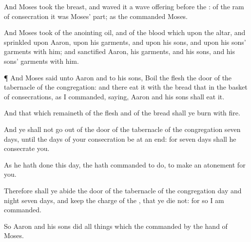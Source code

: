 {And
Moses
took the
breast, and
waved it
{} a wave
offering
before the
{}:
{} of the
ram of
consecration it was
Moses’
part; as the
{}
commanded
Moses.

And
Moses
took of the
anointing
oil, and of the
blood which
{} upon the
altar, and
sprinkled
{} upon
Aaron,
{} upon his
garments, and upon his
sons, and upon his
sons’
garments with him; and
sanctified
Aaron,
{} his
garments, and his
sons, and his
sons’
garments with him.


\par }{\PP {}¶ And
Moses
said unto
Aaron and to his
sons,
Boil the
flesh
{} the
door of the
tabernacle of the
congregation: and there
eat it with the
bread that
{} in the
basket of
consecrations, as I
commanded,
saying,
Aaron and his
sons shall
eat it.

And that which
remaineth of the
flesh and of the
bread shall ye
burn with
fire.

And ye shall not go
out of the
door of the
tabernacle of the
congregation
{}
seven
days, until the
days of your
consecration be at an
end: for
seven
days shall he
consecrate you.

As he hath
done this
day,
{} the
{} hath
commanded to
do, to make an
atonement for you.

Therefore shall ye
abide
{} the
door of the
tabernacle of the
congregation
day and
night
seven
days, and
keep the
charge of the
{}, that ye
die not: for so I am
commanded.

So
Aaron and his
sons
did all
things which the
{}
commanded by the
hand of
Moses.




\par }
